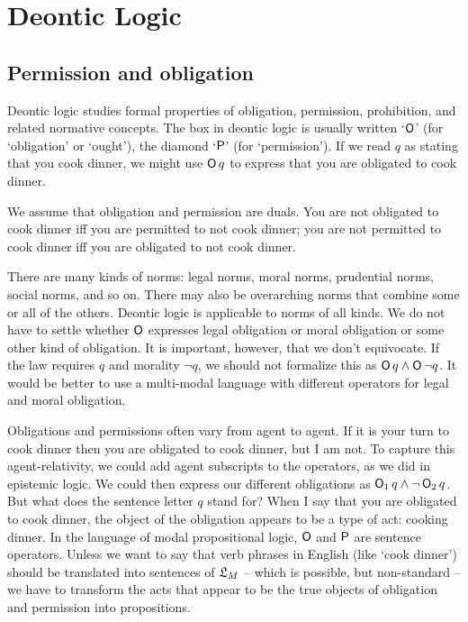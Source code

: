 \chapter{Deontic Logic}\label{ch:deontic}

\section{Permission and obligation}

Deontic logic studies formal properties of obligation, permission, prohibition,
and related normative concepts. The box in deontic logic is usually written
`$\operatorname{\mathsf{O}}$' (for `obligation' or `ought'), the diamond `$\operatorname{\mathsf{P}}$' (for `permission').
If we read $q$ as stating that you cook dinner, we might use $\operatorname{\mathsf{O}} q$ to express
that you are obligated to cook dinner.

We assume that obligation and permission are duals. You are not obligated to
cook dinner iff you are permitted to not cook dinner; you are not permitted to
cook dinner iff you are obligated to not cook dinner.

There are many kinds of norms: legal norms, moral norms, prudential norms,
social norms, and so on. There may also be overarching norms that combine some
or all of the others. Deontic logic is applicable to norms of all kinds. We do
not have to settle whether $\operatorname{\mathsf{O}}$ expresses legal obligation or moral obligation
or some other kind of obligation. It is important, however, that we don't
equivocate. If the law requires $q$ and morality $\neg q$, we should not
formalize this as $\operatorname{\mathsf{O}} q \land \operatorname{\mathsf{O}} \neg q$. It would be better to use a
multi-modal language with different operators for legal and moral obligation.


Obligations and permissions often vary from agent to agent. If it is your turn
to cook dinner then you are obligated to cook dinner, but I am not. To capture
this agent-relativity, we could add agent subscripts to the operators, as we did
in epistemic logic. We could then express our different obligations as
$\operatorname{\mathsf{O}}_1 q \land \neg \operatorname{\mathsf{O}}_2 q$. But what does the sentence letter $q$ stand for?
When I say that you are obligated to cook dinner, the object of the obligation
appears to be a type of act: cooking dinner. In the language of modal
propositional logic, $\operatorname{\mathsf{O}}$ and $\operatorname{\mathsf{P}}$ are sentence operators. Unless we want to
say that verb phrases in English (like `cook dinner') should be translated into
sentences of $\mathfrak{L}_M$ -- which is possible, but non-standard -- we have to
transform the acts that appear to be the true objects of obligation and
permission into propositions.

